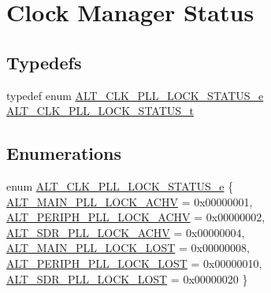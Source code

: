 \hypertarget{group__CLK__MGR__STATUS}{}\section{Clock Manager Status}
\label{group__CLK__MGR__STATUS}
\subsection*{Typedefs}
\begin{DoxyCompactItemize}
\item 
typedef enum \mbox{\hyperlink{group__CLK__MGR__STATUS_gafe0eda739fa3d56ec20c0ea5b328cb49}{A\+L\+T\+\_\+\+C\+L\+K\+\_\+\+P\+L\+L\+\_\+\+L\+O\+C\+K\+\_\+\+S\+T\+A\+T\+U\+S\+\_\+e}} \mbox{\hyperlink{group__CLK__MGR__STATUS_ga62fbfc277685cad341f57ee0a252092c}{A\+L\+T\+\_\+\+C\+L\+K\+\_\+\+P\+L\+L\+\_\+\+L\+O\+C\+K\+\_\+\+S\+T\+A\+T\+U\+S\+\_\+t}}
\end{DoxyCompactItemize}
\subsection*{Enumerations}
\begin{DoxyCompactItemize}
\item 
enum \mbox{\hyperlink{group__CLK__MGR__STATUS_gafe0eda739fa3d56ec20c0ea5b328cb49}{A\+L\+T\+\_\+\+C\+L\+K\+\_\+\+P\+L\+L\+\_\+\+L\+O\+C\+K\+\_\+\+S\+T\+A\+T\+U\+S\+\_\+e}} \{ \newline
\mbox{\hyperlink{group__CLK__MGR__STATUS_ggafe0eda739fa3d56ec20c0ea5b328cb49a873eabbd8274e13118ff2e53d68bcdbe}{A\+L\+T\+\_\+\+M\+A\+I\+N\+\_\+\+P\+L\+L\+\_\+\+L\+O\+C\+K\+\_\+\+A\+C\+HV}} = 0x00000001, 
\mbox{\hyperlink{group__CLK__MGR__STATUS_ggafe0eda739fa3d56ec20c0ea5b328cb49ae5accb80e945783f47b0c48e13fefa1d}{A\+L\+T\+\_\+\+P\+E\+R\+I\+P\+H\+\_\+\+P\+L\+L\+\_\+\+L\+O\+C\+K\+\_\+\+A\+C\+HV}} = 0x00000002, 
\mbox{\hyperlink{group__CLK__MGR__STATUS_ggafe0eda739fa3d56ec20c0ea5b328cb49a9994e50f813352a4f87dc50c67d411ae}{A\+L\+T\+\_\+\+S\+D\+R\+\_\+\+P\+L\+L\+\_\+\+L\+O\+C\+K\+\_\+\+A\+C\+HV}} = 0x00000004, 
\mbox{\hyperlink{group__CLK__MGR__STATUS_ggafe0eda739fa3d56ec20c0ea5b328cb49aefe370cf16abbec9604bb8a06d0d6c32}{A\+L\+T\+\_\+\+M\+A\+I\+N\+\_\+\+P\+L\+L\+\_\+\+L\+O\+C\+K\+\_\+\+L\+O\+ST}} = 0x00000008, 
\newline
\mbox{\hyperlink{group__CLK__MGR__STATUS_ggafe0eda739fa3d56ec20c0ea5b328cb49a1b485e26141a258bf6d56cdb7ac89ff2}{A\+L\+T\+\_\+\+P\+E\+R\+I\+P\+H\+\_\+\+P\+L\+L\+\_\+\+L\+O\+C\+K\+\_\+\+L\+O\+ST}} = 0x00000010, 
\mbox{\hyperlink{group__CLK__MGR__STATUS_ggafe0eda739fa3d56ec20c0ea5b328cb49a104b3e02fd581b5e207adad1b9a6047a}{A\+L\+T\+\_\+\+S\+D\+R\+\_\+\+P\+L\+L\+\_\+\+L\+O\+C\+K\+\_\+\+L\+O\+ST}} = 0x00000020
 \}
\end{DoxyCompactItemize}
